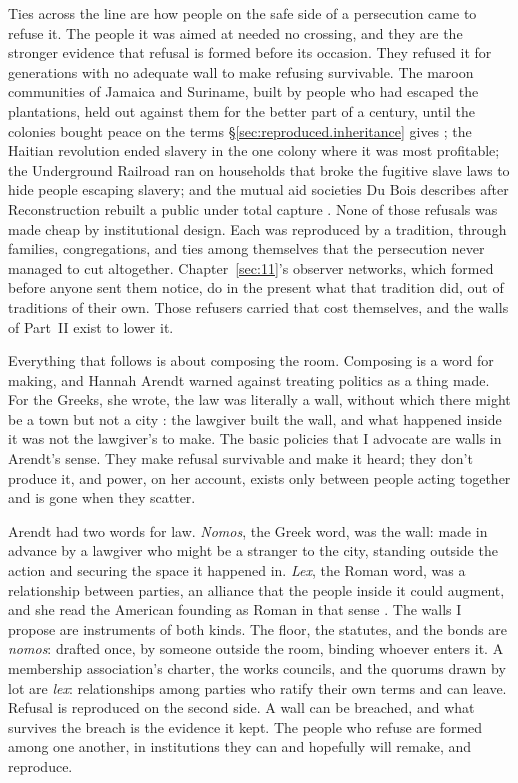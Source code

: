 Ties across the line are how people on the safe side of a persecution came to refuse it. The people it was aimed at needed no crossing, and they are the stronger evidence that refusal is formed before its occasion. They refused it for generations with no adequate wall to make refusing survivable. The maroon communities of Jamaica and Suriname, built by people who had escaped the plantations, held out against them for the better part of a century, until the colonies bought peace on the terms \S\ref{sec:reproduced.inheritance} gives \autocite{price1996maroon}; the Haitian revolution ended slavery in the one colony where it was most profitable; the Underground Railroad ran on households that broke the fugitive slave laws to hide people escaping slavery; and the mutual aid societies Du Bois describes after Reconstruction rebuilt a public under total capture \autocite[24–25, 92–108]{dubois1907economic}. None of those refusals was made cheap by institutional design. Each was reproduced by a tradition, through families, congregations, and ties among themselves that the persecution never managed to cut altogether. Chapter~\ref{sec:11}'s observer networks, which formed before anyone sent them notice, do in the present what that tradition did, out of traditions of their own. Those refusers carried that cost themselves, and the walls of Part~II exist to lower it.

Everything that follows is about composing the room. Composing is a word for making, and Hannah Arendt warned against treating politics as a thing made. For the Greeks, she wrote, the law was literally a wall, without which there might be a town but not a city \autocite{arendt1958human}: the lawgiver built the wall, and what happened inside it was not the lawgiver's to make. The basic policies that I advocate are walls in Arendt's sense. They make refusal survivable and make it heard; they don't produce it, and power, on her account, exists only between people acting together and is gone when they scatter.

Arendt had two words for law. \emph{Nomos}, the Greek word, was the wall: made in advance by a lawgiver who might be a stranger to the city, standing outside the action and securing the space it happened in. \emph{Lex}, the Roman word, was a relationship between parties, an alliance that the people inside it could augment, and she read the American founding as Roman in that sense \autocite{arendt1958human,arendt1963revolution}. The walls I propose are instruments of both kinds. The floor, the statutes, and the bonds are \emph{nomos}: drafted once, by someone outside the room, binding whoever enters it. A membership association's charter, the works councils, and the quorums drawn by lot are \emph{lex}: relationships among parties who ratify their own terms and can leave. Refusal is reproduced on the second side. A wall can be breached, and what survives the breach is the evidence it kept. The people who refuse are formed among one another, in institutions they can and hopefully will remake, and reproduce.

